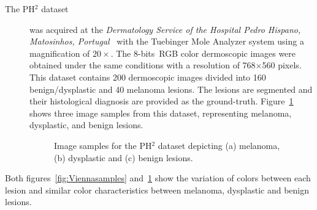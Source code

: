 \begin{description}
\item [The PH$^{2}$ dataset] was acquired at the \textit{Dermatology Service of the Hospital Pedro Hispano, Matosinhos, Portugal}~\cite{mendoncca2013ph} with the Tuebinger Mole Analyzer system using a magnification of $20\times$.
The 8-bits~RGB color dermoscopic images were obtained under the same conditions with a resolution of 768$\times$560 pixels. 
This dataset contains 200 dermoscopic images divided into 160 benign/dysplastic and 40 melanoma lesions. 
The lesions are segmented and their histological diagnosis are provided as the ground-truth. 
Figure~\ref{fig:PH2samples} shows three image samples from this dataset, representing melanoma, dysplastic, and benign lesions. 
\begin{figure}
\begin{center}
  \hspace*{\fill}
  \hfill
  \hfill
  \hspace*{\fill}
  \caption[Image samples of the PH$^{2}$ dataset]{Image samples for the PH$^2$ dataset depicting (a) melanoma, (b) dysplastic and (c) benign lesions.}
  \label{fig:PH2samples}
\end{center}	
\end{figure}

\end{description}
Both figures~\ref{fig:Viennasamples} and~\ref{fig:PH2samples} show the variation of colors between each lesion and similar color characteristics between melanoma, dysplastic and benign lesions.

